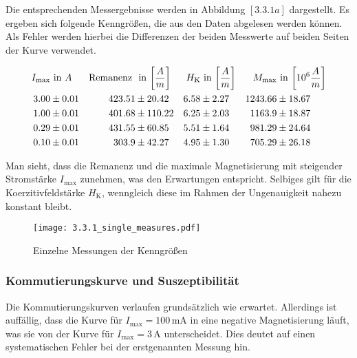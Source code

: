 \documentclass[12pt,a4paper]{scrartcl}
\numberwithin{equation}{section} %
\renewcommand{\[}{} %
\renewcommand{\]}{\noindent} %
\begin{document}
Die entsprechenden Messergebnisse werden in Abbildung \([3.3.1a]\)
dargestellt. Es ergeben sich folgende Kenngrößen, die aus den Daten
abgelesen werden können. Als Fehler werden hierbei die Differenzen der
beiden Messwerte auf beiden Seiten der Kurve verwendet.

\[
\begin{align*}
    I_\mathrm{max} &\text{ in } A &
        \text{Remanenz } &\text{ in }
            {\tiny \left[ \frac{A}{m} \right] } &
        H_\mathrm{K} &\text{ in }
            {\tiny \left[ \frac{A}{m} \right] } &
        M_\mathrm{max} &\text{ in }
            {\tiny \left[10^6 \frac{A}{m} \right] }
        \\
    3.00 &\pm 0.01 &
        423.51 &\pm 20.42 &
        6.58 &\pm 2.27 &
        1243.66 &\pm 18.67
        \\
    1.00 &\pm 0.01 &
        401.68 &\pm 110.22 &
        6.25 &\pm 2.03 &
        1163.9 &\pm 18.87
        \\
    0.29 &\pm 0.01 &
        431.55 &\pm 60.85 &
        5.51 &\pm 1.64 &
        981.29 &\pm 24.64
        \\
    0.10 &\pm 0.01 &
        303.9 &\pm 42.27 &
        4.95 &\pm 1.30 &
        705.29 &\pm 26.18
        \\
\end{align*}
\]

Man sieht, dass die Remanenz und die maximale Magnetisierung mit
steigender Stromstärke \(I_\mathrm{max}\) zunehmen, was den Erwartungen
entspricht. Selbiges gilt für die Koerzitivfeldstärke \(H_\mathrm{K}\),
wenngleich diese im Rahmen der Ungenauigkeit nahezu konstant bleibt.

\begin{figure}
\centering
\texttt{[image: 3.3.1\_single\_measures.pdf]}
\caption{Einzelne Messungen der Kenngrößen}
\end{figure}

\hypertarget{kommutierungskurve-und-suszeptibilituxe4t}{%
\subsubsection{Kommutierungskurve und
Suszeptibilität}\label{kommutierungskurve-und-suszeptibilituxe4t}}

Die Kommutierungskurven verlaufen grundsätzlich wie erwartet. Allerdings
ist auffällig, dass die Kurve für \(I_\mathrm{max}=100\mathrm{\,mA}\) in
eine negative Magnetisierung läuft, was sie von der Kurve für
\(I_\mathrm{max}= 3\,\mathrm A\) unterscheidet. Dies deutet auf einen
systematischen Fehler bei der erstgenannten Messung hin.
\end{document}
